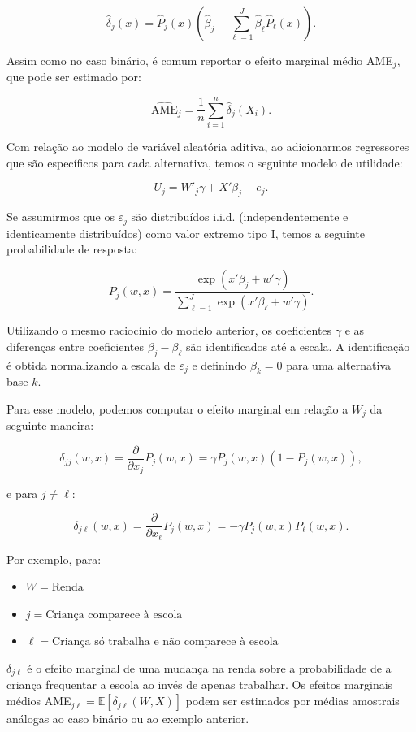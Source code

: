 \documentclass[12pt]{article}
\theoremstyle{break}
\begin{document}
\[
\hat{\delta}_j(x) = \hat{P}_j(x) \left( \hat{{\beta}}_j - \sum_{\ell=1}^{J} \hat{{\beta}}_\ell \hat{P}_\ell(x) \right).
\]

Assim como no caso binário, é comum reportar o efeito marginal médio AME$_j$, que pode ser estimado por:

\[
\widehat{\text{AME}}_j = \frac{1}{n} \sum_{i=1}^{n} \hat{\delta}_j(X_i).
\]

Com relação ao modelo de variável aleatória aditiva, ao adicionarmos regressores que são específicos para cada alternativa, temos o seguinte modelo de utilidade:

\[
U_j = {W}'_j{\gamma} + {X}' {\beta}_j + e_j.
\]

Se assumirmos que os \( \varepsilon_j \) são distribuídos i.i.d. (independentemente e identicamente distribuídos) como valor extremo tipo I, temos a seguinte probabilidade de resposta:

\[
P_j(w, x) = \frac{\exp\left( {x}' {\beta}_j + {w}' {\gamma} \right)}{\sum_{\ell=1}^{J} \exp\left( {x}' {\beta}_\ell + {w}' {\gamma} \right)}.
\]

Utilizando o mesmo raciocínio do modelo anterior, os coeficientes \( {\gamma} \) e as diferenças entre coeficientes \( {\beta}_j - {\beta}_\ell \) são identificados até a escala. A identificação é obtida normalizando a escala de \( \varepsilon_j \) e definindo \( {\beta}_k = 0 \) para uma alternativa base \( k \).

Para esse modelo, podemos computar o efeito marginal em relação a \( W_j \) da seguinte maneira:

\[
\delta_{jj}(w, x) = \frac{\partial}{\partial x_j} P_j(w, x) = {\gamma} P_j(w, x) \left(1 - P_j(w, x)\right),
\]

e para \( j \neq \ell \):

\[
\delta_{j\ell}(w, x) = \frac{\partial}{\partial x_\ell} P_j(w, x) = -{\gamma} P_j(w, x) P_\ell(w, x).
\]

Por exemplo, para:
\begin{itemize}
    \item  $W = \text{Renda}$ 
    \item  $j  = \text{Criança comparece à escola}$ 
    \item  $\ell = \text{Criança só trabalha e não comparece à escola}$
\end{itemize}

\( \delta_{j\ell} \) é o efeito marginal de uma mudança na renda sobre a probabilidade de a criança frequentar a escola ao invés de apenas trabalhar. Os efeitos marginais médios AME$_{j\ell} = \mathbb{E}\left[\delta_{j\ell}(W, X)\right]$ podem ser estimados por médias amostrais análogas ao caso binário ou ao exemplo anterior.
\end{document}

